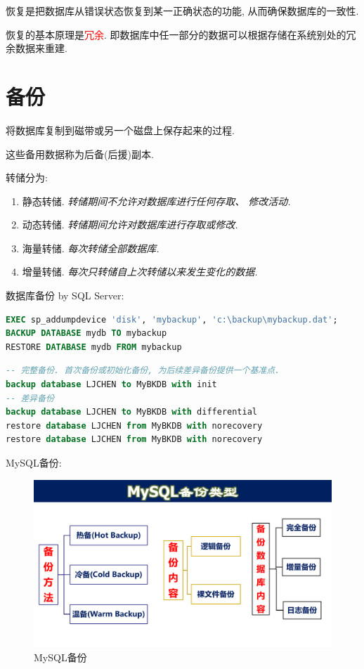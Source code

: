 \begin{definition}[恢复]
恢复是把数据库从错误状态恢复到某一正确状态的功能, 从而确保数据库的一致性.

恢复的基本原理是\textcolor{red}{冗余}. 即数据库中任一部分的数据可以根据存储在系统别处的冗余数据来重建.
\end{definition}

\section{备份}

\begin{definition}[转储]
将数据库复制到磁带或另一个磁盘上保存起来的过程.

这些备用数据称为后备(后援)副本.
\end{definition}

转储分为:
\begin{enumerate}
    \item 静态转储. \textit{转储期间不允许对数据库进行任何存取、 修改活动.}
    \item 动态转储. \textit{转储期间允许对数据库进行存取或修改.}
    \item 海量转储. \textit{每次转储全部数据库.}
    \item 增量转储. \textit{每次只转储自上次转储以来发生变化的数据.}
\end{enumerate}

数据库备份 by SQL Server:
\begin{lstlisting}[language=sql]
EXEC sp_addumpdevice 'disk', 'mybackup', 'c:\backup\mybackup.dat';
BACKUP DATABASE mydb TO mybackup
RESTORE DATABASE mydb FROM mybackup
\end{lstlisting}

\begin{lstlisting}[language=sql]
-- 完整备份. 首次备份或初始化备份, 为后续差异备份提供一个基准点.
backup database LJCHEN to MyBKDB with init
-- 差异备份
backup database LJCHEN to MyBKDB with differential
restore database LJCHEN from MyBKDB with norecovery
restore database LJCHEN from MyBKDB with norecovery
\end{lstlisting}

MySQL备份:
\begin{figure}[H]
    \centering
    \includegraphics[width=.8\textwidth]{./figure/MySQL备份.pdf}
    \caption{MySQL备份}
\end{figure}

